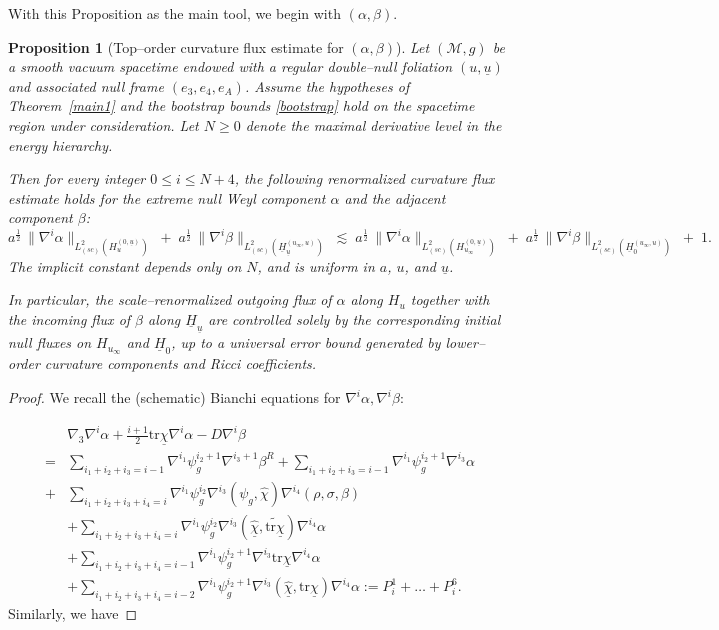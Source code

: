 \documentclass{amsart}
\newtheorem{proposition}{Proposition}[section]
\newcommand{\Hbar}{\underline{H}}
\newcommand{\tbeta}{\beta^R}
\newcommand{\chihat}{\hat{\chi}}
\newcommand{\chibar}{\underline{\chi}}
\newcommand{\chibarhat}{\underline{\hat{\chi}}}
\newcommand{\ubar}{\underline{u}}
\newcommand{\sumitm}{\sum_{i_1+i_2+i_3=i-1}}
\newcommand{\sumif}{\sum_{i_1+i_2+i_3+i_4=i}}
\newcommand{\sumifi}{\sum_{i_1+i_2+i_3+i_4=i-1}}
\newcommand{\sumifim}{\sum_{i_1+i_2+i_3+i_4=i-2}}
\newcommand{\tildetr}{\widetilde{\tr \chibar}}
\newcommand{\nablap}{\nabla^{i_1}\psi_g^{i_2}}
\newcommand{\nablapp}{\nabla^{i_1}\psi_g^{i_2+1}}
\newcommand{\scaletwoHzero}[1]{\lVert{#1} \rVert_{L^2_{(sc)}(H_{u_{\infty}}^{(0,\underline{u})})}}
\newcommand{\scaletwoHu}[1]{\lVert{#1} \rVert_{L^2_{(sc)}(H_u^{(0,\underline{u})})}}
\newcommand{\scaletwoHbarzero}[1]{\lVert{#1} \rVert_{L^2_{(sc)}(\underline{H}_{0}^{(u_{\infty},u)})}}
\newcommand{\scaletwoHbaru}[1]{\lVert{#1} \rVert_{L^2_{(sc)}(\underline{H}_{\underline{u}}^{(u_{\infty},u)})}}
\newcommand{\nablat}{\nabla^{i_3}}
\newcommand{\nablaf}{\nabla^{i_4}}
\newcommand{\tr}{\mbox{tr}}
\begin{document}
{\noindent With this Proposition as the main tool, we begin with $(\alpha, \beta)$.
\begin{proposition}[Top–order curvature flux estimate for $(\alpha,\beta)$]
\label{prop:alpha-beta-flux}
Let $(\mathcal M,g)$ be a smooth vacuum spacetime endowed with a regular double–null
foliation $(u,\ubar)$ and associated null frame $(e_3,e_4,e_A)$. Assume the hypotheses
of Theorem~\ref{main1} and the bootstrap bounds \eqref{bootstrap} hold on the spacetime
region under consideration. Let $N\ge 0$ denote the maximal derivative level in the
energy hierarchy.

\noindent Then for every integer $0\le i\le N+4$, the following renormalized curvature flux
estimate holds for the extreme null Weyl component $\alpha$ and the adjacent component
$\beta$:
\begin{equation}
\label{eq:alpha-beta-flux}
a^{\frac12}\,\scaletwoHu{\nabla^{i}\alpha}
\;+\;
a^{\frac12}\,\scaletwoHbaru{\nabla^{i}\beta}
\;\lesssim\;
a^{\frac12}\,\scaletwoHzero{\nabla^{i}\alpha}
\;+\;
a^{\frac12}\,\scaletwoHbarzero{\nabla^{i}\beta}
\;+\; 1.
\end{equation}
The implicit constant depends only on $N$, and is uniform
in $a$, $u$, and $\ubar$.
\medskip

\noindent
In particular, the scale–renormalized outgoing flux of $\alpha$ along $H_u$ together
with the incoming flux of $\beta$ along $\Hbar_{\ubar}$ are controlled solely by the
corresponding initial null fluxes on $H_{u_\infty}$ and $\Hbar_{0}$, up to a universal
error bound generated by lower–order curvature components and Ricci coefficients.
\end{proposition}



\begin{proof}
We recall the (schematic) Bianchi equations for $\nabla^i \alpha, \nabla^i \beta$: 

  
    \begin{align}  \nonumber
       & \nabla_3 \nabla^i \alpha + \frac{i+1}{2}\tr\chibar \nabla^i\alpha - D\nabla^{i}\beta \\ \nonumber =& \sumitm \nablapp \nabla^{i_3+1}\tbeta +\sumitm \nablapp \nablat \alpha\\  \nonumber +& \sumif \nablap \nablat (\psi_g,\chihat) \nablaf (\rho,\sigma, \beta) \\ \nonumber &+  \sumif \nablap \nablat (\chibarhat,\tildetr) \nablaf \alpha \\ \nonumber &+ \sumifi \nablapp \nablat \tr\chibar \nablaf \alpha \\ &+\sumifim \nablapp \nablat(\chibarhat,\tr\chibar)\nablaf \alpha:=P_i^1 +\dots + P_i^{6}.
    \end{align}Similarly, we have 
    

\end{proof}}
\end{document}
